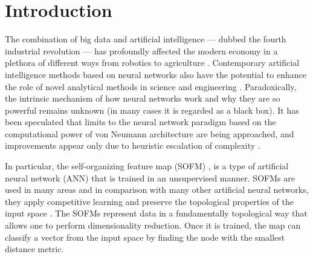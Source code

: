 \documentclass[pra,showkeys,twocolumn,showpacs]{revtex4-1}
\begin{document}
\maketitle



\section{Introduction}
The combination of big data and artificial intelligence ---  dubbed the fourth industrial revolution --- has profoundly affected the modern economy in a plethora of different ways from robotics to agriculture \cite{Lecun2015, ghahramani2015,schwab2017,esteva2019, tyrsa2017}.
Contemporary artificial intelligence methods based on neural networks also have the potential to enhance the role of novel analytical methods in science and engineering \cite{kaggle2014, radovic2018, butler2018, radovic2018}.
Paradoxically, the intrinsic mechanism of how neural networks work and why they are so powerful remains unknown (in many cases it is regarded as a black box).
It has been speculated that limits to the neural network paradigm based on the computational power of von Neumann architecture are being approached,
and improvements appear only due to heuristic escalation of complexity \cite{marcus2018,sze2017,kourtis2020}.

In particular, the self-organizing feature map (SOFM) \cite{kohonen1990,kohonen1996,kohonen1997}, is a type of artificial neural network (ANN)
that is trained in an unsupervised manner.
SOFMs are used in many areas \cite{vilibic2016, guido1998, doszkocs1990, jones2012,mori2019,corsello2017,zhu2018,chea2016}
and in comparison with many other artificial neural networks, they apply competitive learning and preserve the topological properties of the input space \cite{kiviluotoa1996}.
The SOFMs represent data in a fundamentally topological way that allows one to perform dimensionality reduction.
Once it is trained, the map can classify a vector from the input space by finding the node with the smallest distance metric.
\end{document}
